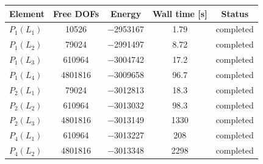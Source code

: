 \begin{tabular}{@{}l c c c c@{}}
\toprule
Element & Free DOFs & Energy & Wall time [s] & Status \\
\midrule
$P_{1}(L_{1})$ & \num{10526} & \num{-2953167} & \num{1.79} & completed \\
$P_{1}(L_{2})$ & \num{79024} & \num{-2991497} & \num{8.72} & completed \\
$P_{1}(L_{3})$ & \num{610964} & \num{-3004742} & \num{17.2} & completed \\
$P_{1}(L_{4})$ & \num{4801816} & \num{-3009658} & \num{96.7} & completed \\
$P_{2}(L_{1})$ & \num{79024} & \num{-3012813} & \num{18.3} & completed \\
$P_{2}(L_{2})$ & \num{610964} & \num{-3013032} & \num{98.3} & completed \\
$P_{2}(L_{3})$ & \num{4801816} & \num{-3013149} & \num{1330} & completed \\
$P_{4}(L_{1})$ & \num{610964} & \num{-3013227} & \num{208} & completed \\
$P_{4}(L_{2})$ & \num{4801816} & \num{-3013348} & \num{2298} & completed \\
\bottomrule
\end{tabular}
